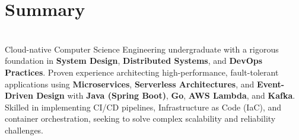 \MainDivider
\section*{Summary}
\BigDivider\\
\noindent
Cloud-native Computer Science Engineering undergraduate with a rigorous foundation in \textbf{System Design}, \textbf{Distributed Systems}, and \textbf{DevOps Practices}. Proven experience architecting high-performance, fault-tolerant applications using \textbf{Microservices}, \textbf{Serverless Architectures}, and \textbf{Event-Driven Design} with \textbf{Java (Spring Boot)}, \textbf{Go}, \textbf{AWS Lambda}, and \textbf{Kafka}. Skilled in implementing CI/CD pipelines, Infrastructure as Code (IaC), and container orchestration, seeking to solve complex scalability and reliability challenges.
